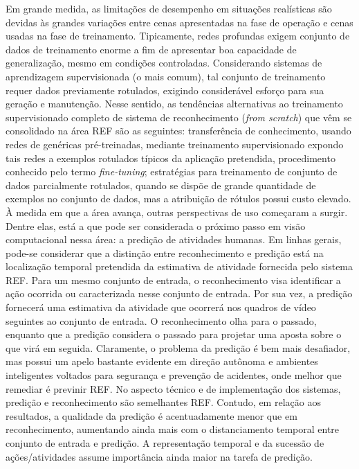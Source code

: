 Em grande medida, as limitações de desempenho em situações realísticas são devidas às grandes variações entre cenas apresentadas na fase de operação e cenas usadas na fase de treinamento. Tipicamente, redes profundas exigem  conjunto de dados de treinamento enorme a fim de apresentar boa capacidade de generalização, mesmo em condições controladas. Considerando sistemas de aprendizagem supervisionada (o mais comum), tal conjunto de treinamento requer dados previamente rotulados, exigindo considerável esforço para sua geração e manutenção. Nesse sentido, as tendências alternativas ao treinamento supervisionado completo de sistema de reconhecimento (\emph{from scratch}) que vêm se consolidado na área REF são as seguintes: transferência de conhecimento, usando redes de genéricas pré-treinadas, mediante treinamento supervisionado expondo tais redes a exemplos rotulados típicos da aplicação pretendida, procedimento conhecido pelo termo \emph{fine-tuning}; estratégias para treinamento de conjunto de dados parcialmente rotulados, quando se dispõe de grande quantidade de exemplos no conjunto de dados, mas a atribuição de rótulos possui custo elevado.
À medida em que a área avança, outras perspectivas de uso começaram a surgir. Dentre elas, está a que pode ser considerada o próximo passo em visão computacional nessa área: a predição de atividades humanas. Em linhas gerais, pode-se considerar que a distinção entre reconhecimento e predição está na localização temporal pretendida da estimativa de atividade fornecida pelo sistema REF. Para um mesmo conjunto de entrada, o reconhecimento visa identificar a ação ocorrida ou caracterizada nesse conjunto de entrada. Por sua vez, a predição fornecerá uma estimativa da atividade que ocorrerá nos quadros de vídeo seguintes ao conjunto de entrada. O reconhecimento olha para o passado, enquanto que a predição considera o passado para projetar uma aposta sobre o que virá em seguida. Claramente, o problema da predição é bem mais desafiador, mas possui um apelo bastante evidente em direção autônoma e ambientes inteligentes voltados para segurança e prevenção de acidentes, onde melhor que remediar é previnir REF. No aspecto técnico e de implementação dos sistemas, predição e reconhecimento são semelhantes REF. Contudo, em relação aos resultados, a qualidade da predição é acentuadamente menor que em reconhecimento, aumentando ainda mais com o distanciamento temporal entre conjunto de entrada e predição. A representação temporal e da sucessão de ações/atividades assume importância ainda maior na tarefa de predição.
